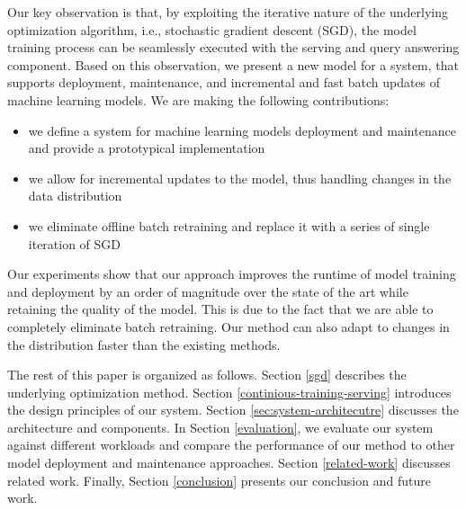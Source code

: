\documentclass{vldb}
\begin{document}
Our key observation is that, by exploiting the iterative nature of the underlying optimization algorithm, i.e., stochastic gradient descent (SGD), the model training process can be seamlessly executed with the serving and query answering component.
Based on this observation, we present a new model for a system, that supports deployment, maintenance, and incremental and fast batch updates of machine learning models.
We are making the following contributions: 
\begin{itemize}
\item we define a system for machine learning models deployment and maintenance and provide a prototypical implementation
\item we allow for incremental updates to the model, thus handling changes in the data distribution
\item we eliminate offline batch retraining and replace it with a series of single iteration of SGD
\end{itemize}
Our experiments show that our approach improves the runtime of model training and deployment by an order of magnitude over the state of the art while retaining the quality of the model. 
This is due to the fact that we are able to completely eliminate batch retraining. 
Our method can also adapt to changes in the distribution faster than the existing methods.

The rest of this paper is organized as follows. 
Section \ref{sgd} describes the underlying optimization method.
Section \ref{continious-training-serving} introduces the design principles of our system. 
Section \ref{sec:system-architecutre} discusses the architecture and components.
In Section \ref{evaluation}, we evaluate our system against different workloads and compare the performance of our method to other model deployment and maintenance approaches. 
Section \ref {related-work} discusses related work.
Finally, Section \ref{conclusion} presents our conclusion and future work.
\end{document}
